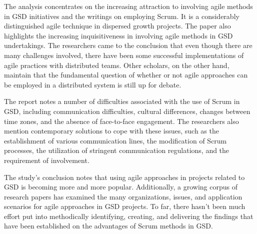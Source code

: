 \documentclass[conference]{IEEEtran}
\begin{document}
The analysis concentrates on the increasing attraction to involving agile methods in GSD initiatives and the writings on employing Scrum. It is a considerably distinguished agile technique in dispersed growth projects. The paper also highlights the increasing inquisitiveness in involving agile methods in GSD undertakings. The researchers came to the conclusion that even though there are many challenges involved, there have been some successful implementations of agile practices with distributed teams. Other scholars, on the other hand, maintain that the fundamental question of whether or not agile approaches can be employed in a distributed system is still up for debate.

The report notes a number of difficulties associated with the use of Scrum in GSD, including communication difficulties, cultural differences, changes between time zones, and the absence of face-to-face engagement. The researchers also mention contemporary solutions to cope with these issues, such as the establishment of various communication lines, the modification of Scrum processes, the utilization of stringent communication regulations, and the requirement of involvement.

The study's conclusion notes that using agile approaches in projects related to GSD is becoming more and more popular. Additionally, a growing corpus of research papers has examined the many organizations, issues, and application scenarios for agile approaches in GSD projects. To far, there hasn't been much effort put into methodically identifying, creating, and delivering the findings that have been established on the advantages of Scrum methods in GSD.
\end{document}
